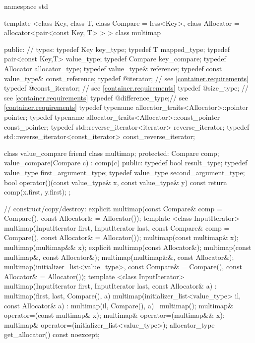 \begin{codeblock}
namespace std {
  template <class Key, class T, class Compare = less<Key>,
            class Allocator = allocator<pair<const Key, T> > >
  class multimap {
  public:
    // types:
    typedef Key                                   key_type;
    typedef T                                     mapped_type;
    typedef pair<const Key,T>                     value_type;
    typedef Compare                               key_compare;
    typedef Allocator                             allocator_type;
    typedef value_type&                           reference;
    typedef const value_type&                     const_reference;
    typedef @\impdef@                iterator;       // see \ref{container.requirements}
    typedef @\impdef@                const_iterator; // see \ref{container.requirements}
    typedef @\impdef@                size_type;      // see \ref{container.requirements}
    typedef @\impdef@                difference_type;// see \ref{container.requirements}
    typedef typename allocator_traits<Allocator>::pointer           pointer;
    typedef typename allocator_traits<Allocator>::const_pointer     const_pointer;
    typedef std::reverse_iterator<iterator>       reverse_iterator;
    typedef std::reverse_iterator<const_iterator> const_reverse_iterator;

    class value_compare {
    friend class multimap;
    protected:
      Compare comp;
      value_compare(Compare c) : comp(c) { }
    public:
      typedef bool result_type;
      typedef value_type first_argument_type;
      typedef value_type second_argument_type;
      bool operator()(const value_type& x, const value_type& y) const {
        return comp(x.first, y.first);
      }
    };

    // construct/copy/destroy:
    explicit multimap(const Compare& comp = Compare(),
                      const Allocator& = Allocator());
    template <class InputIterator>
      multimap(InputIterator first, InputIterator last,
               const Compare& comp = Compare(),
               const Allocator& = Allocator());
    multimap(const multimap& x);
    multimap(multimap&& x);
    explicit multimap(const Allocator&);
    multimap(const multimap&, const Allocator&);
    multimap(multimap&&, const Allocator&);
    multimap(initializer_list<value_type>,
      const Compare& = Compare(),
      const Allocator& = Allocator());
    template <class InputIterator>
    multimap(InputIterator first, InputIterator last, const Allocator& a)
      : multimap(first, last, Compare(), a) { }
    multimap(initializer_list<value_type> il, const Allocator& a)
      : multimap(il, Compare(), a) { }
   ~multimap();
    multimap& operator=(const multimap& x);
    multimap& operator=(multimap&& x);
    multimap& operator=(initializer_list<value_type>);
    allocator_type get_allocator() const noexcept;

}}
\end{codeblock}
